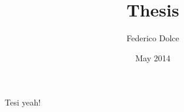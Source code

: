 \documentclass{article}
\title{Thesis}
\author{Federico Dolce}
\date{May 2014}
\begin{document}
	\maketitle
	Tesi yeah!
\end{document}
